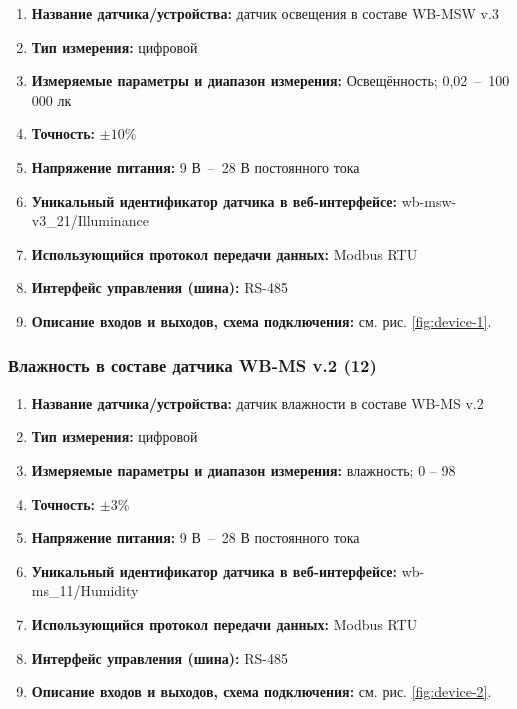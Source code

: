 \documentclass[a4paper,14pt]{extarticle}
\begin{document}
\begin{enumerate}
	\item \textbf{Название датчика/устройства:} датчик освещения в составе WB-MSW v.3
	
	\item \textbf{Тип измерения:} цифровой
	
	\item  \textbf{Измеряемые параметры и диапазон измерения:} Освещённость; 0,02~--~100 000 лк
	
	\item  \textbf{Точность:} $\pm10 \%$	
	\item  \textbf{Напряжение питания:} 9 В~--~28 В постоянного тока
	
	\item  \textbf{Уникальный идентификатор датчика в веб-интерфейсе:} wb-msw-v3\_21/Illuminance
	
	\item  \textbf{Использующийся протокол передачи данных:} Modbus RTU
	
	\item  \textbf{Интерфейс управления (шина):} RS-485
	
	\item  \textbf{Описание входов и выходов, схема подключения:} см. рис. \ref{fig:device-1}.
\end{enumerate}


\subsubsection*{Влажность в составе датчика WB-MS v.2 (12)}
\begin{enumerate}
	\item \textbf{Название датчика/устройства:} датчик влажности в составе WB-MS v.2
	
	\item \textbf{Тип измерения:} цифровой
	
	\item  \textbf{Измеряемые параметры и диапазон измерения:} влажность; 0 – 98 %
	
	\item  \textbf{Точность:} $\pm3 \%$	
	\item  \textbf{Напряжение питания:} 9 В~--~28 В постоянного тока
	
	\item  \textbf{Уникальный идентификатор датчика в веб-интерфейсе:} wb-ms\_11/Humidity
	
	\item  \textbf{Использующийся протокол передачи данных:} Modbus RTU
	
	\item  \textbf{Интерфейс управления (шина):} RS-485
	
	\item  \textbf{Описание входов и выходов, схема подключения:} см. рис. \ref{fig:device-2}.
	
\end{enumerate}
\end{document}
